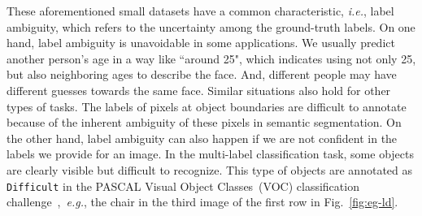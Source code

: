 \documentclass[journal]{IEEEtran}
\begin{document}
These aforementioned small datasets have a common characteristic, \emph{i.e.}, label ambiguity, which refers to the uncertainty among the ground-truth labels. On one hand, label ambiguity is unavoidable in some applications. We usually predict another person's age in a way like ``around 25", which indicates using not only 25, but also neighboring ages to describe the face. And, different people may have different guesses towards the same face. Similar situations also hold for other types of tasks. The labels of pixels at object boundaries are difficult to annotate because of the inherent ambiguity of these pixels in semantic segmentation. On the other hand, label ambiguity can also happen if we are not confident in the labels we provide for an image. In the multi-label classification task, some objects are clearly visible but difficult to recognize. This type of objects are annotated as \texttt{Difficult} in the PASCAL Visual Object Classes~(VOC) classification challenge~\cite{everingham2010pascal},~\emph{e.g.}, the chair in the third image of the first row in Fig.~\ref{fig:eg-ld}. 

\begin{figure*}
  \centering
  \caption{Different label distributions for different recognition tasks. The first row shows four images, with the first two images coming from \emph{ChaLearn 2015} and \emph{Pointing'04} and the last two images coming from the PASCAL \emph{VOC2007} classification task and the PASCAL \emph{VOC2011} segmentation challenge. The second row shows their corresponding label distributions~(best viewed in color).} \label{fig:eg-ld}
\end{figure*}
\end{document}
